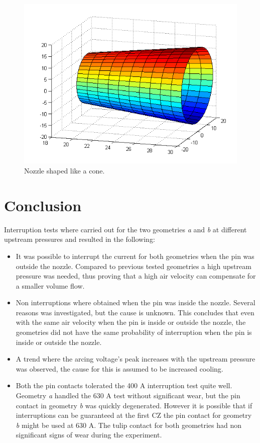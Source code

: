 \documentclass[10pt,a4paper,twoside]{article}
\begin{document}
\begin{figure}[H]
\centering
\includegraphics[scale=0.6]{Bilder/Discussion/cone_D16.png}
\caption{Nozzle shaped like a cone.} \label{fig:cone_D16}
\end{figure}

\cleardoublepage

\section{Conclusion}
Interruption tests where carried out for the two geometries \textit{a} and \textit{b} at different upstream pressures and resulted in the following:
\begin{itemize}
\item	It was possible to interrupt the current for both geometries when the pin was outside the nozzle. Compared to previous tested geometries a high upstream pressure was needed, thus proving that a high air velocity can compensate for a smaller volume flow.
\item	Non interruptions where obtained when the pin was inside the nozzle. Several reasons was investigated, but the cause is unknown. This concludes that even with the same air velocity when the pin is inside or outside the  nozzle, the geometries did not have the same probability of interruption when the pin is inside or outside the nozzle.
\item	A trend where the arcing voltage's peak increases with the upstream pressure was observed, the cause for this is assumed to be increased cooling.

\item Both the pin contacts tolerated the 400 A interruption test quite well. Geometry \textit{a} handled the 630 A test without significant wear, but the pin contact in geometry \textit{b} was quickly degenerated. However it is possible that if interruptions can be guaranteed at the first CZ the pin contact for geometry \textit{b} might be used at 630 A. The tulip contact for both geometries had non significant signs of wear during the experiment.
\end{itemize}
\end{document}
